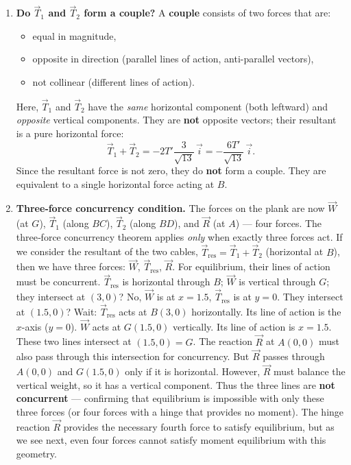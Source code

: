 \documentclass[11pt]{article}
\begin{document}
\begin{enumerate}
    \item \textbf{Do $\vec{T}_1$ and $\vec{T}_2$ form a couple?}
    A \textbf{couple} consists of two forces that are:
    \begin{itemize}
        \item equal in magnitude,
        \item opposite in direction (parallel lines of action, anti-parallel vectors),
        \item not collinear (different lines of action).
    \end{itemize}
    Here, $\vec{T}_1$ and $\vec{T}_2$ have the \emph{same} horizontal component (both leftward) and \emph{opposite} vertical components. They are \textbf{not} opposite vectors; their resultant is a pure horizontal force:
    \[
    \vec{T}_1 + \vec{T}_2 = -2T'\frac{3}{\sqrt{13}}\,\vec{i} = -\frac{6T'}{\sqrt{13}}\,\vec{i}.
    \]
    Since the resultant force is not zero, they do \textbf{not} form a couple. They are equivalent to a single horizontal force acting at $B$.

    \item \textbf{Three‑force concurrency condition.}
    The forces on the plank are now $\vec{W}$ (at $G$), $\vec{T}_1$ (along $BC$), $\vec{T}_2$ (along $BD$), and $\vec{R}$ (at $A$) — four forces. The three‑force concurrency theorem applies \emph{only} when exactly three forces act. If we consider the resultant of the two cables, $\vec{T}_{\text{res}} = \vec{T}_1+\vec{T}_2$ (horizontal at $B$), then we have three forces: $\vec{W}$, $\vec{T}_{\text{res}}$, $\vec{R}$. For equilibrium, their lines of action must be concurrent. $\vec{T}_{\text{res}}$ is horizontal through $B$; $\vec{W}$ is vertical through $G$; they intersect at $(3,0)$? No, $\vec{W}$ is at $x=1.5$, $\vec{T}_{\text{res}}$ is at $y=0$. They intersect at $(1.5,0)$? Wait: $\vec{T}_{\text{res}}$ acts at $B(3,0)$ horizontally. Its line of action is the $x$-axis ($y=0$). $\vec{W}$ acts at $G(1.5,0)$ vertically. Its line of action is $x=1.5$. These two lines intersect at $(1.5,0) = G$. The reaction $\vec{R}$ at $A(0,0)$ must also pass through this intersection for concurrency. But $\vec{R}$ passes through $A(0,0)$ and $G(1.5,0)$ only if it is horizontal. However, $\vec{R}$ must balance the vertical weight, so it has a vertical component. Thus the three lines are \textbf{not concurrent} — confirming that equilibrium is impossible with only these three forces (or four forces with a hinge that provides no moment). The hinge reaction $\vec{R}$ provides the necessary fourth force to satisfy equilibrium, but as we see next, even four forces cannot satisfy moment equilibrium with this geometry.


\end{enumerate}
\end{document}
